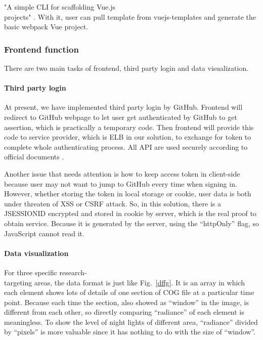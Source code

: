 \documentclass[conference]{IEEEtran}
\begin{document}
"A simple CLI for scaffolding Vue.js \\projects" \cite{Introduc89:online}. With it, user can pull template from vuejs-templates and generate 
the basic webpack \+ Vue project.

\subsubsection{Frontend function}

There are two main tasks of frontend, third party login and data visualization.

\paragraph{Third party login}

At present, we have implemented third party login by GitHub. Frontend will redirect to GitHub webpage to let user get authenticated 
by GitHub to get assertion, which is practically a temporary code. Then frontend will provide this code to service provider, which 
is ELB in our solution, to exchange for token to complete whole authenticating process. All API are used securely according to official 
documents \cite{Authoriz26:online}.

Another issue that needs attention is how to keep access token in client-side because user may not want to jump to GitHub every time when signing in. However, whether storing the token in local storage or cookie, user data is both under threaten of XSS or CSRF attack. So, in this solution, there is a JSESSIONID encrypted and stored in cookie by server, which is the real proof to obtain service. Because it is generated by the server, using the “httpOnly” flag, so JavaScript cannot read it.

\paragraph{Data visualization}

For three specific research-\\ targeting areas, the data format is just like Fig.~\ref{dffg}. It is an array in which 
each element shows lots of details of one section of COG file at a particular time point. Because each time the section, also showed 
as “window” in the image, is different from each other, so directly comparing “radiance” of each element is meaningless. To show the 
level of night lights of different area, “radiance” divided by “pixels” is more valuable since it has nothing to do with the size of 
“window”.
\end{document}
